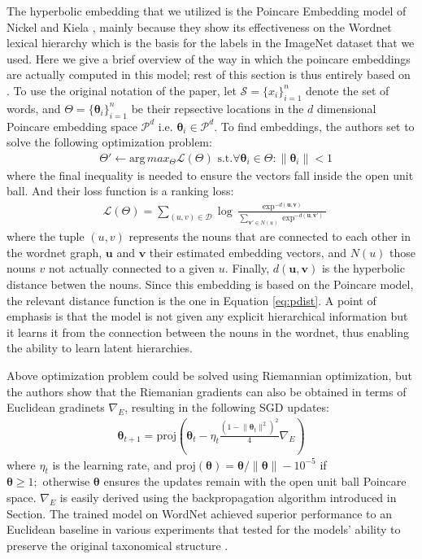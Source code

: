 \documentclass[12pt]{report}
\begin{document}
The hyperbolic embedding that we utilized is the Poincare Embedding model of Nickel and Kiela \cite{Nickel2017}, mainly because they show its effectiveness on the Wordnet lexical hierarchy which is the basis for the labels in the ImageNet dataset that we used. Here we give a brief overview of the way in which the poincare embeddings are actually computed in this model; rest of this section is thus entirely based on \cite{Nickel2017}.  To use the original notation of the paper, let $\mathcal{S} = \{x_i\}_{i=1}^n$ denote the set of words, and $\Theta = \{\boldsymbol{\theta}_i\}_{i=1}^n$ be their repsective locations in the $d$ dimensional Poincare embedding space $\mathcal{P}^d$ i.e. $\boldsymbol{\theta}_i \in \mathcal{P}^d$. To find embeddings, the authors set to solve the following optimization problem:
\begin{align*}
  &\Theta' \leftarrow \text{arg}\,max_{\Theta} \mathcal{L}\left(\Theta\right)\text{  s.t.} \forall \boldsymbol{\theta}_i \in \Theta : \lVert \boldsymbol{\theta}_i \rVert < 1
\end{align*}
where the final inequality is needed to ensure the vectors fall inside the open unit ball. And their loss function is a ranking loss:
\begin{align*}
  &\mathcal{L} \left(\Theta\right) = \sum_{(u,v) \in \mathcal{D}} \log \frac{\exp^{-d( \mathbf{u},\mathbf{v})}}{\sum_{\mathbf{v'}\in N(u)}\exp^{-d(\mathbf{u},\mathbf{v'})}}
\end{align*}
where the tuple $(u,v)$ represents the nouns that are connected to each other in the wordnet graph, $\mathbf{u}$ and $\mathbf{v}$ their estimated embedding vectors, and $N(u)$ those nouns $v$ not actually connected to a given $u$. Finally, $d(\mathbf{u}, \mathbf{v})$ is the hyperbolic distance betwen the nouns. Since this embedding is based on the Poincare model, the relevant distance function is the one in Equation \ref{eq:pdist}. A point of emphasis is that the model is not given any explicit hierarchical information but it learns it from the connection between the nouns in the wordnet, thus enabling the ability to learn latent hierarchies. 

Above optimization problem could be solved using Riemannian optimization, but the authors show that the Riemanian gradients can also be obtained in terms of Euclidean gradinets $\nabla_E$, resulting in the following SGD updates:  
\begin{align*}
  \boldsymbol{\theta}_{t+1} = \text{proj} \left( \boldsymbol{\theta}_t -\eta_t \frac{(1-\lVert\boldsymbol{\theta}_t\rVert^2)^2}{4}\nabla_E \right)
\end{align*}
where $\eta_t$ is the learning rate, and $\text{proj}(\boldsymbol{\theta}) = \boldsymbol{\theta}/\lVert \boldsymbol{\theta} \rVert - 10^{-5}$ if $ \boldsymbol{\theta} \geq 1; \text{ otherwise } \boldsymbol{\theta}$ ensures the updates remain with the open unit ball Poincare space. $\nabla_E$ is easily derived using the backpropagation algorithm introduced in Section. The trained model on WordNet achieved superior performance to an Euclidean baseline in various experiments that tested for the models' ability to preserve the original taxonomical structure \cite{Nickel2017}.
\end{document}

